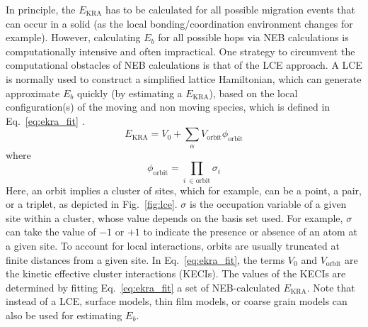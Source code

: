 \documentclass[a4paper,fleqn]{cas-dc}
\begin{document}
{In principle, the  $E_\mathrm{KRA}$ has to be calculated for all possible migration events that can occur in a solid (as the local bonding/coordination environment changes for example). However, calculating $E_b$ for all possible hops via NEB calculations is computationally intensive and often impractical. One strategy to circumvent the computational obstacles of  NEB calculations is that of the LCE approach.  A LCE is normally used to construct a simplified lattice Hamiltonian, which can generate approximate $E_b$ quickly (by estimating a $E_\mathrm{KRA}$), based on the local configuration(s) of the moving and non moving species, which is defined in Eq.~\ref{eq:ekra_fit} \cite{van_der_ven_first-principles_2001,van_der_ven_first-principles_2018}. 
%
\begin{equation}
    \label{eq:ekra_fit}
    E_\mathrm{KRA} = V_0 + \sum_{\alpha}V_\mathrm{orbit} \phi_\mathrm{orbit}
\end{equation}
%
where 
%
\begin{equation}
    \label{eq:poly_occ_variable}
    \phi_\mathrm{orbit} = \prod_{i\ \in  \mathrm{orbit}} \sigma_{i}
\end{equation}
%
Here, an orbit implies a cluster of sites, which for example, can be a point, a pair, or a triplet, as depicted in Fig.~\ref{fig:lce}. $\sigma$ is the occupation variable of a given site within a cluster, whose value depends on the basis set used. For example, $\sigma$ can take the value of $-1$ or $+1$ to indicate the presence or absence of an atom at a given site. To account for local interactions, orbits are usually truncated at finite distances from a given site. In Eq.~\ref{eq:ekra_fit}, the terms $V_0$ and $V_\mathrm{orbit}$ are the kinetic effective cluster interactions (KECIs). The values of the KECIs are determined by fitting Eq.~\ref{eq:ekra_fit}  a set of NEB-calculated $E_\mathrm{KRA}$. Note that instead of a LCE, surface models, thin film models, or coarse grain models \cite{chatterjee_multiscale_2006,collins_coarse-grained_2008} can also be used for estimating $E_b$.

}
\end{document}

